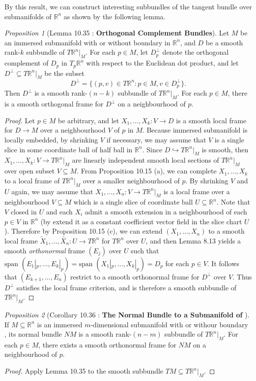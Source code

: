 \documentclass[a4paper]{article}
\theoremstyle{remark}
\newtheorem{prop}{Proposition}
\newcommand{\rn}{\mathbb{R}^n} %
\newcommand{\subhim}{\subseteq} %
\begin{document}
By this result, we can construct interesting subbundles of the tangent bundle over submanifolds of $\rn$ as shown by the following lemma.

\begin{prop}[Lemma 10.35 : \textbf{Orthogonal Complement Bundles}]
Let $M$ be an immersed submanifold with or without boundary in $\rn$, and $D$ be a smooth rank-$k$ subbundle of $T\rn|_M$. For each $p \in M$, let $D_p^{\perp}$ denote the orthogonal complement of $D_p$ in $T_p\rn$ with respect to the Euclidean dot product, and let $D^{\perp} \subhim T\rn|_M$ be the subset 
$$
D^{\perp} = \{ (p,v)\in T\rn : p\in M, v \in D_p^{\perp} \}.
$$ 
Then $D^{\perp}$ is a smooth rank-$(n-k)$ subbundle of $T\rn|_M$. For each $p \in M$, there is a smooth orthogonal frame for $D^{\perp}$ on a neighbourhood of $p$.
\end{prop}
\begin{proof}
Let $p \in M$ be arbitrary, and let $X_1,\dots,X_k : V \to D$ is a smooth local frame for $D \to M$ over a neighbourhood $V$ of $p$ in $M$. Because immersed submanifold is locally embedded, by shrinking $V$ if necessary, we may assume that $V$ is a single slice in some coordinate ball of half ball in $\rn$. Since $D \hookrightarrow T\rn|_M$ is smooth, then $X_1,\dots,X_k : V \to T\rn|_M$ are linearly independent smooth local sections of $T\rn|_M$ over open subset $V \subhim M$. From Proposition 10.15 (a), we can complete $X_1,\dots,X_k$ to a local frame of $T\rn|_M$ over a smaller neighbourhood of $p$. By shrinking $V$ and $U$ again, we may assume that $X_1,\dots,X_n : V \to T\rn|_M$ is a local frame over a neighbourhood $V \subhim M$ which is a single slice of coordinate ball $U \subhim \rn$. Note that $V$ closed in $U$ and each $X_i$ admit a smooth extension in a neighbourhood of each $p\in V$ in $\rn$ (by extend it as a constant coefficient vector field in the slice chart $U$). Therefore by Proposition 10.15 (c), we can extend $(X_1,\dots,X_n)$ to a smooth local frame $\widetilde{X}_1,\dots,\widetilde{X_n} : U \to T\rn$ for $T\rn$ over $U$, and then Lemma 8.13 yields a smooth \textit{orthonormal} frame $(E_j)$ over $U$ such that $\text{span } (E_1|_p,\dots,E_k|_p) = \text{span }(X_1|_p,\dots,X_k|_p) = D_p$ for each $p \in V$. It follows that $(E_{k+1},\dots,E_n)$ restrict to a smooth orthonormal frame for $D^{\perp}$ over $V$. Thus $D^{\perp}$ satisfies the local frame criterion, and is therefore a smooth subbundle of $T\rn|_M$.
\end{proof}

\begin{prop}[Corollary 10.36 : \textbf{The Normal Bundle to a Submanifold of \boldmath{$\rn$}}]
If $M \subhim \rn$ is an immersed $m$-dimensional submanifold with or withour boundary , its normal bundle $NM$ is a smooth rank-$(n-m)$ subbundle of $T\rn|_M$. For each $p \in M$, there exists a smooth orthonormal frame for $NM$ on a neighbourhood of $p$.
\end{prop}
\begin{proof}
Apply Lemma 10.35 to the smooth subbundle $TM \subhim T\rn|_M$.
\end{proof}
\end{document}
